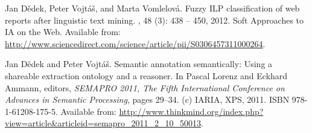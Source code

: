 \begin{description}
\item
Jan D{\v{e}}dek, Peter Vojt{\'{a}}{\v{s}}, and Marta Vomlelov{\'{a}}.
\newblock Fuzzy {ILP} classification of web reports after linguistic text
  mining.
, 48 (3):
  438 -- 450, 2012.
\newblock Soft Approaches to IA on the Web.
\newblock Available from:
  \url{http://www.sciencedirect.com/science/article/pii/S0306457311000264}.

\item
Jan D{\v{e}}dek and Peter Vojt{\'{a}}{\v{s}}.
\newblock Semantic annotation semantically: Using a shareable extraction
  ontology and a reasoner.
\newblock In Pascal Lorenz and Eckhard Ammann, editors, {\em {SEMAPRO 2011},
  The Fifth International Conference on Advances in Semantic Processing}, pages
  29--34. (c) {IARIA}, {XPS}, 2011.
\newblock ISBN 978-1-61208-175-5.
\newblock Available from:
  \url{http://www.thinkmind.org/index.php?view=article&articleid=semapro_2011_2_10_50013}.

\end{description}

